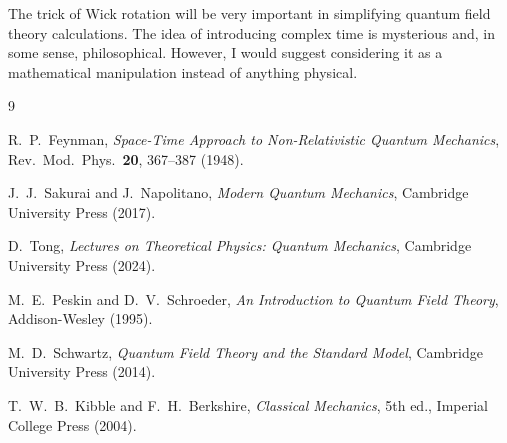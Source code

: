 \documentclass[12pt,a4paper]{article}
\begin{document}
The trick of Wick rotation will be very important in simplifying quantum field theory calculations.
The idea of introducing complex time is mysterious and, in some sense, philosophical.
However, I would suggest considering it as a mathematical manipulation instead of anything physical.


\newpage
\begin{thebibliography}{9}

R.~P.~Feynman,
\textit{Space-Time Approach to Non-Relativistic Quantum Mechanics},
Rev.\ Mod.\ Phys.\ \textbf{20}, 367--387 (1948).


J.~J.~Sakurai and J.~Napolitano,
\textit{Modern Quantum Mechanics},
Cambridge University Press (2017).

D.~Tong,
\textit{Lectures on Theoretical Physics: Quantum Mechanics},
Cambridge University Press (2024).

M.~E.~Peskin and D.~V.~Schroeder,
\textit{An Introduction to Quantum Field Theory},
Addison-Wesley (1995).

M.~D.~Schwartz,
\textit{Quantum Field Theory and the Standard Model},
Cambridge University Press (2014).

T.~W.~B.~Kibble and F.~H.~Berkshire,
\textit{Classical Mechanics},
5th ed., Imperial College Press (2004).

\end{thebibliography}
\end{document}
